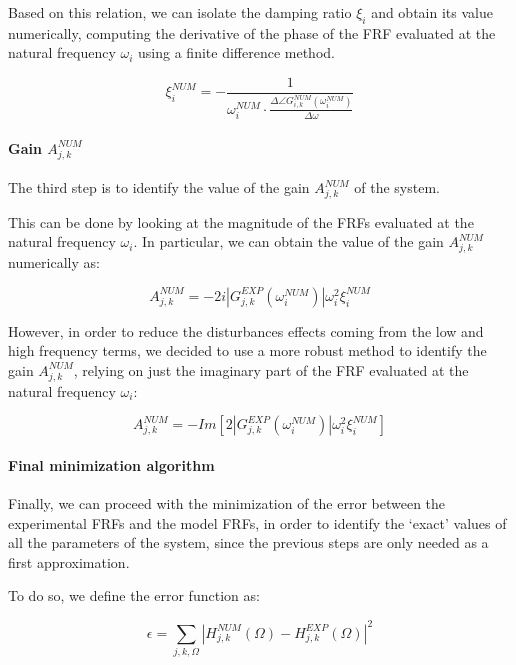 Based on this relation, we can isolate the damping ratio $\xi_i$ and obtain its value numerically, computing the derivative of the phase of the FRF evaluated at the natural frequency $\omega_i$ using a finite difference method.

\begin{equation}
    \xi_i^{NUM} = - \frac{1}{\omega_i^{NUM} \cdot \frac{\Delta \angle G_{i,k}^{NUM}(\omega_i^{NUM})}{\Delta \omega}}
\end{equation}

\paragraph{Gain $A_{j, k}^{NUM}$}

The third step is to identify the value of the gain $A_{j, k}^{NUM}$ of the system.

This can be done by looking at the magnitude of the FRFs evaluated at the natural frequency $\omega_i$.
In particular, we can obtain the value of the gain $A_{j, k}^{NUM}$ numerically as:

\begin{equation}
    A_{j, k}^{NUM} = -2i \left| G_{j, k}^{EXP}(\omega_i^{NUM}) \right| \omega_i^2 \xi_i^{NUM}
\end{equation}

However, in order to reduce the disturbances effects coming from the low and high frequency terms, we decided to use a more robust method to identify the gain $A_{j, k}^{NUM}$, relying on just the imaginary part of the FRF evaluated at the natural frequency $\omega_i$:

\begin{equation}
    A_{j, k}^{NUM} = - Im\left[2\left| G_{j, k}^{EXP}(\omega_i^{NUM}) \right| \omega_i^2 \xi_i^{NUM}\right]
\end{equation}

\paragraph{Final minimization algorithm}

Finally, we can proceed with the minimization of the error between the experimental FRFs and the model FRFs, in order to identify the `exact' values of all the parameters of the system, since the previous steps are only needed as a first approximation.

To do so, we define the error function as:

\begin{equation}
    \epsilon = \sum_{j, k, \Omega} \left| H_{j, k}^{NUM}(\Omega) - H_{j, k}^{EXP}(\Omega) \right|^2
    \label{eq:error_function}
\end{equation}

